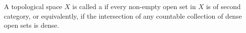 A topological space $X$ is called a  if every non-empty open set in $X$ is of second category, or equivalently, if the intersection of any countable collection of dense open sets is dense.
